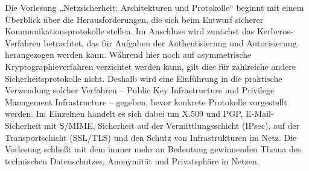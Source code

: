 \begin{module}
\begin{learningoutcomes}
\end{learningoutcomes}

\begin{content}
Die Vorlesung „Netzsicherheit: Architekturen und Protokolle“ beginnt mit einem Überblick über die Herausforderungen, die sich beim Entwurf sicherer Kommunikationsprotokolle stellen. Im Anschluss wird zunächst das Kerberos-Verfahren betrachtet, das für Aufgaben der Authentisierung und Autorisierung herangezogen werden kann. Während hier noch auf asymmetrische Kryptographieverfahren verzichtet werden kann, gilt dies für zahlreiche andere Sicherheitsprotokolle nicht. Deshalb wird eine Einführung in die praktische Verwendung solcher Verfahren – Public Key Infrastructure und Privilege Management Infrastructure – gegeben, bevor konkrete Protokolle vorgestellt werden. Im Einzelnen handelt es sich dabei um X.509 und PGP, E-Mail-Sicherheit mit S/MIME, Sicherheit auf der Vermittlungsschicht (IPsec), auf der Transportschicht (SSL/TLS) und den Schutz von Infrastrukturen im Netz. Die Vorlesung schließt mit dem immer mehr an Bedeutung gewinnenden Thema des technischen Datenschutzes, Anonymität und Privatsphäre in Netzen.


\end{content}



\end{module}

